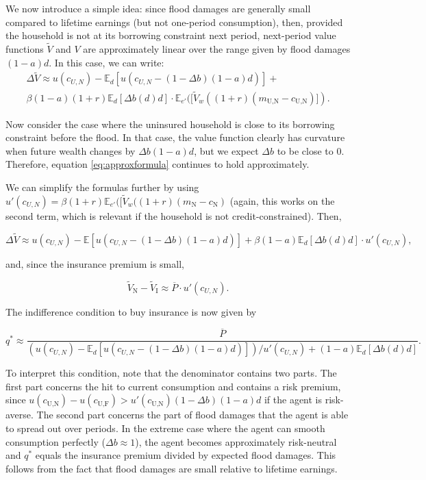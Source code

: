 \documentclass[12pt]{article}
\begin{document}
We now introduce a simple idea: since flood damages are generally small compared to lifetime earnings (but not one-period consumption), then, provided the household is not at its borrowing constraint next period, next-period value functions $\tilde{V}$ and $V$ are approximately linear over the range given by flood damages $(1-a)d$. In this case, we can write:
\begin{align}\label{eq:approxformula}
\Delta \tilde{V} \approx u(c_{U,N})-\mathbb{E}_d[u(c_{U,N}-(1-\Delta b)(1-a)d)]+ \nonumber \\ \beta(1-a)(1+r)\mathbb{E}_d[\Delta b(d)d]\cdot\mathbb{E}_{e'}([\tilde{V}_w((1+r)(m_\text{U,N}-c_\text{U,N})]).
\end{align}

Now consider the case where the uninsured household is close to its borrowing constraint before the flood. In that case, the value function clearly has curvature when future wealth changes by $\Delta b(1-a)d$, but we expect  $\Delta b$ to be close to $0$. Therefore, equation \eqref{eq:approxformula} continues to hold approximately. 

We can simplify the formulas further by using $u'(c_{U,N})=\beta(1+r)\mathbb{E}_{e'}([\tilde{V}_w((1+r)(m_\text{N}-c_\text{N})$ (again, this works on the second term, which is relevant if the household is not credit-constrained). Then,   

\begin{equation}\label{eq:approxformulasimple}
\Delta \tilde{V} \approx u(c_{U,N})-\mathbb{E}[u(c_{U,N}-(1-\Delta b)(1-a)d)]+\beta(1-a)\mathbb{E}_d[\Delta b(d)d]\cdot u'(c_{U,N}),
\end{equation}

and, since the insurance premium is small,

\begin{equation}
\tilde{V}_{\text{N}}-\tilde{V}_{\text{I}}\approx\overline{P} \cdot u'(c_{U,N}).
\end{equation}

The indifference condition to buy insurance is now given by

\begin{equation}
q^*\approx\frac{\overline{P}}{(u(c_{U,N})-\mathbb{E}_d[u(c_{U,N}-(1-\Delta b)(1-a)d)])/u'(c_{U,N})+(1-a)\mathbb{E}_d[\Delta b(d)d]}.
\end{equation}

To interpret this condition, note that the denominator contains two parts. The first part concerns the hit to current consumption and contains a risk premium, since $u(c_{\text{U,N}})-u(c_{\text{U,F}})>u'(c_{\text{U,N}})(1-\Delta b)(1-a)d$ if the agent is risk-averse. The second part concerns the part of flood damages that the agent is able to spread out over periods. In the extreme case where the agent can smooth consumption perfectly ($\Delta b\approx1$), the agent becomes approximately risk-neutral and $q^*$ equals the insurance premium divided by expected flood damages. This follows from the fact that flood damages are small relative to lifetime earnings. 
\end{document}
